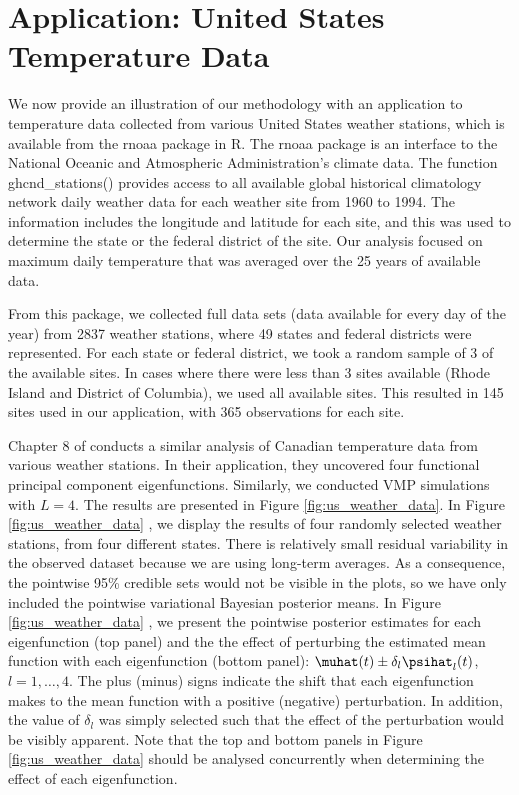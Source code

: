 \documentclass[12pt]{article}
\theoremstyle{plain}
\theoremstyle{definition}
\theoremstyle{remark}
\begin{document}

\section{Application: United States Temperature Data}
\label{sec:us_weather_data}

We now provide an illustration of our methodology with an application to temperature data collected from
various United
States weather stations, which is available from the \textsf{rnoaa} package \cite{rnoaa21} in \textsf{R}.
The \textsf{rnoaa}
package is an interface to the National Oceanic and Atmospheric Administration's climate data.
The function \textsf{ghcnd\_stations()} provides access to all available global historical climatology
network daily weather data for each weather site from 1960 to 1994. The information includes the longitude
and latitude for each site, and this was used to determine the state or the federal district of the site.
Our analysis focused on
maximum daily temperature that was averaged over the 25 years of available data.

From this package, we collected full data sets (data available for every day
of the year) from 2837 weather stations, where 49 states and federal districts were represented. For each
state or federal district, we took a random sample of 3 of the available sites. In cases where there were
less than 3 sites available (Rhode Island and District of Columbia), we used all available sites. This resulted
in 145 sites used in our application, with 365 observations for each site.

Chapter 8 of  conducts a similar analysis of Canadian temperature data from various weather
stations. In their application, they uncovered four functional principal component eigenfunctions.
Similarly, we conducted VMP simulations with $L = 4$.
The results are presented in Figure \ref{fig:us_weather_data}. In Figure \ref{fig:us_weather_data}
, we display the results of four randomly selected weather stations, from four different
states. There is relatively small residual variability in the observed dataset because we are using long-term averages.
As a consequence, the pointwise 95\% credible sets would not be visible in the plots,
so we have only included the pointwise variational Bayesian posterior means.
In Figure \ref{fig:us_weather_data} , we present the pointwise posterior estimates
for each eigenfunction (top panel) and the
the effect of perturbing the estimated mean function with each eigenfunction (bottom panel):
$\muhat (t) \pm \delta_l \psihat_l (t)$,
$l = 1, \dots, 4$. The plus (minus) signs indicate the shift that each eigenfunction makes to the mean function
with a positive (negative) perturbation. In addition, the value of $\delta_l$ was simply selected such that the effect
of the perturbation would be visibly apparent. Note that the top and bottom panels in Figure
\ref{fig:us_weather_data}  should be analysed concurrently when determining
the effect of each eigenfunction.
\end{document}
